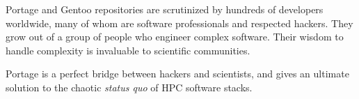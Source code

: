 \documentclass[a4paper,conference]{IEEEtran}
\begin{document}
Portage and Gentoo repositories are scrutinized by hundreds of
developers worldwide, many of whom are software professionals and
respected hackers. They grow out of a group of people who engineer
complex software. Their wisdom to handle complexity is invaluable to
scientific communities.

Portage is a perfect bridge between hackers and scientists, and gives
an ultimate solution to the chaotic \emph{status quo} of HPC software
stacks.



\end{document}
